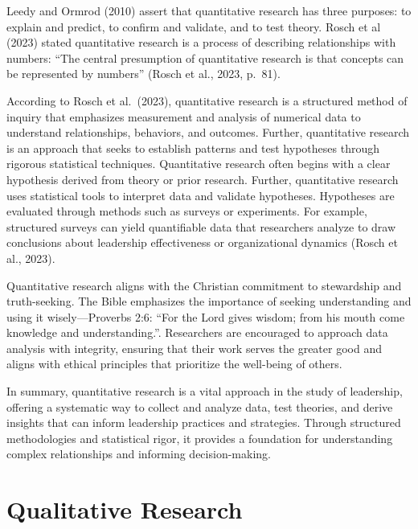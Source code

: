 \documentclass[
  letterpaper,
  DIV=11,
  numbers=noendperiod]{scrreprt}
\begin{document}

Leedy and Ormrod (2010) assert that quantitative research has three
purposes: to explain and predict, to confirm and validate, and to test
theory. Rosch et al (2023) stated quantitative research is a process of
describing relationships with numbers: ``The central presumption of
quantitative research is that concepts can be represented by numbers''
(Rosch et al., 2023, p.~81).

According to Rosch et al.~(2023), quantitative research is a structured
method of inquiry that emphasizes measurement and analysis of numerical
data to understand relationships, behaviors, and outcomes. Further,
quantitative research is an approach that seeks to establish patterns
and test hypotheses through rigorous statistical techniques.
Quantitative research often begins with a clear hypothesis derived from
theory or prior research. Further, quantitative research uses
statistical tools to interpret data and validate hypotheses. Hypotheses
are evaluated through methods such as surveys or experiments. For
example, structured surveys can yield quantifiable data that researchers
analyze to draw conclusions about leadership effectiveness or
organizational dynamics (Rosch et al., 2023).

Quantitative research aligns with the Christian commitment to
stewardship and truth-seeking. The Bible emphasizes the importance of
seeking understanding and using it wisely---Proverbs 2:6: ``For the Lord
gives wisdom; from his mouth come knowledge and understanding.''.
Researchers are encouraged to approach data analysis with integrity,
ensuring that their work serves the greater good and aligns with ethical
principles that prioritize the well-being of others.

In summary, quantitative research is a vital approach in the study of
leadership, offering a systematic way to collect and analyze data, test
theories, and derive insights that can inform leadership practices and
strategies. Through structured methodologies and statistical rigor, it
provides a foundation for understanding complex relationships and
informing decision-making.


\chapter*{Qualitative Research}\label{qualitative-research}
\end{document}
